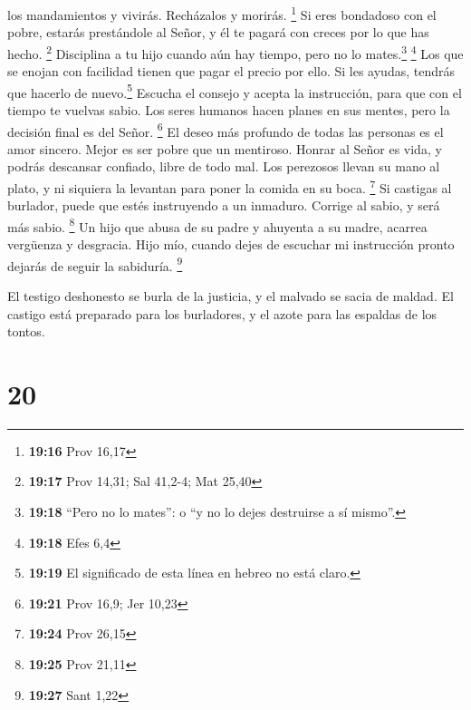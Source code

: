 los mandamientos y vivirás. Recházalos y morirás. \footnote{\textbf{19:16}
  Prov 16,17}  Si eres bondadoso con el pobre, estarás
prestándole al Señor, y él te pagará con creces por lo que has hecho.
\footnote{\textbf{19:17} Prov 14,31; Sal 41,2-4; Mat 25,40}
 Disciplina a tu hijo cuando aún hay tiempo, pero no lo
mates.\footnote{\textbf{19:18} ``Pero no lo mates'': o ``y no lo dejes
  destruirse a sí mismo''.} \footnote{\textbf{19:18} Efes 6,4}
 Los que se enojan con facilidad tienen que pagar el
precio por ello. Si les ayudas, tendrás que hacerlo de nuevo.\footnote{\textbf{19:19}
  El significado de esta línea en hebreo no está claro.} 
Escucha el consejo y acepta la instrucción, para que con el tiempo te
vuelvas sabio.  Los seres humanos hacen planes en sus
mentes, pero la decisión final es del Señor. \footnote{\textbf{19:21}
  Prov 16,9; Jer 10,23}  El deseo más profundo de todas
las personas es el amor sincero. Mejor es ser pobre que un mentiroso.
 Honrar al Señor es vida, y podrás descansar confiado,
libre de todo mal.  Los perezosos llevan su mano al
plato, y ni siquiera la levantan para poner la comida en su boca.
\footnote{\textbf{19:24} Prov 26,15}  Si castigas al
burlador, puede que estés instruyendo a un inmaduro. Corrige al sabio, y
será más sabio. \footnote{\textbf{19:25} Prov 21,11}  Un
hijo que abusa de su padre y ahuyenta a su madre, acarrea vergüenza y
desgracia.  Hijo mío, cuando dejes de escuchar mi
instrucción pronto dejarás de seguir la sabiduría. \footnote{\textbf{19:27}
  Sant 1,22}

 El testigo deshonesto se burla de la justicia, y el
malvado se sacia de maldad.  El castigo está preparado
para los burladores, y el azote para las espaldas de los tontos.

\hypertarget{section-19}{%
\section{20}\label{section-19}}

